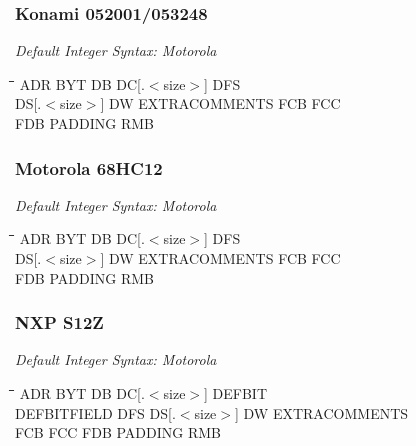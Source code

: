 \subsubsection{Konami 052001/053248}

{\em Default Integer Syntax: Motorola}

{\tt\begin{tabbing}
\hspace{3cm}\=\hspace{3cm}\=\hspace{3cm}\=\hspace{3cm}\=\kill
ADR        \> BYT         \> DB          \> DC[.$<$size$>$] DFS \\
DS[.$<$size$>$] \> DW     \> EXTRACOMMENTS \> FCB         \> FCC \\
FDB        \> PADDING     \> RMB \\
\end{tabbing}}

\subsubsection{Motorola 68HC12}

{\em Default Integer Syntax: Motorola}

{\tt\begin{tabbing}
\hspace{3cm}\=\hspace{3cm}\=\hspace{3cm}\=\hspace{3cm}\=\kill
ADR        \> BYT         \> DB          \> DC[.$<$size$>$] \> DFS \\
DS[.$<$size$>$] DW        \> EXTRACOMMENTS \> FCB           \> FCC \\
FDB        \> PADDING     \> RMB \\
\end{tabbing}}

\subsubsection{NXP S12Z}

{\em Default Integer Syntax: Motorola}

{\tt\begin{tabbing}
\hspace{3cm}\=\hspace{3cm}\=\hspace{3cm}\=\hspace{3cm}\=\kill
ADR        \> BYT         \> DB          \> DC[.$<$size$>$] \> DEFBIT \\
DEFBITFIELD \> DFS        \> DS[.$<$size$>$] \> DW          \> EXTRACOMMENTS \\
FCB        \> FCC         \> FDB         \> PADDING         \> RMB \\
\end{tabbing}}

